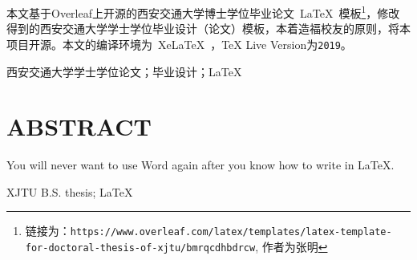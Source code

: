 
\clearpage
\titlespacing{\chapter}{0pt}{0mm}{5mm}



本文基于Overleaf上开源的西安交通大学博士学位毕业论文~\LaTeX~模板\footnote{链接为：\texttt{https://www.overleaf.com/latex/templates/latex-template-for-doctoral-thesis-of-xjtu/bmrqcdhbdrcw}, 作者为张明}，修改得到的西安交通大学学士学位毕业设计（论文）模板，本着造福校友的原则，将本项目开源。{\color{red}本文的编译环境为~XeLaTeX~，TeX Live Version为\texttt{2019}}。

\vspace{\baselineskip}
 西安交通大学学士学位论文；毕业设计；\LaTeX


\clearpage
{}

\titlespacing{\chapter}{0pt}{0mm}{5mm}
\chapter*{ABSTRACT}

\noindent You will never want to use Word again after you know how to write in \LaTeX.

\vspace{\baselineskip}
 XJTU B.S. thesis; \LaTeX


\titlespacing{\chapter}{0pt}{-6mm}{5mm}
\clearpage{\pagestyle{empty}\cleardoublepage}
